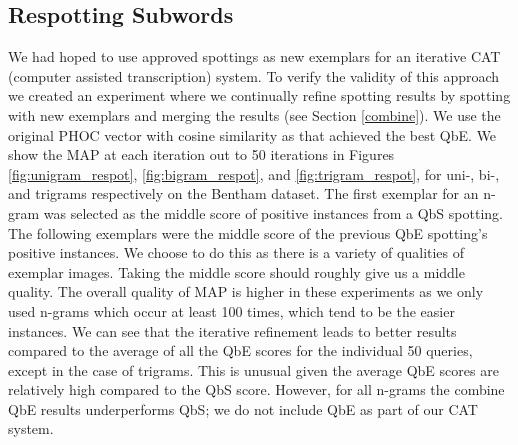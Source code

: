 \documentclass[ms,electronic,twosidetoc,letterpaper,chaptercenter,parttop,lof,lot]{byumsphd}
\begin{document}

\subsection{Respotting Subwords}

We had hoped to use approved spottings as new exemplars for an iterative CAT (computer assisted transcription) system. To verify the validity of this approach we created an experiment where we continually refine spotting results by spotting with new exemplars and merging the results (see Section \ref{combine}). We use the original PHOC vector with cosine similarity as that achieved the best QbE. We show the MAP at each iteration out to 50 iterations in Figures \ref{fig:unigram_respot}, \ref{fig:bigram_respot}, and \ref{fig:trigram_respot}, for uni-, bi-, and trigrams respectively on the Bentham dataset. The first exemplar for an n-gram was selected as the middle score of positive instances from a QbS spotting. The following exemplars were the middle score of the previous QbE spotting's positive instances. We choose to do this as there is a variety of qualities of exemplar images. Taking the middle score should roughly give us a middle quality.
The overall quality of MAP is higher in these experiments as we only used n-grams which occur at least 100 times, which tend to be the easier instances.
We can see that the iterative refinement leads to better results compared to the average of all the QbE scores for the individual 50 queries, except in the case of trigrams. This is unusual given the average QbE scores are relatively high compared to the QbS score. However, for all n-grams the combine QbE results underperforms QbS; we do not include QbE as part of our CAT system.
\end{document}

